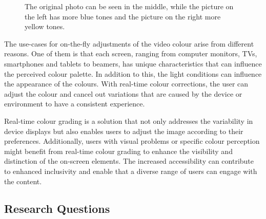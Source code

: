 \documentclass[../MasterThesis.tex]{subfiles}
\begin{document}
	
	\begin{figure}[H]
		\begin{center}
			\caption[Photo in three different colour tones (original, yellow, blue).]{The original photo can be seen in the middle, while the picture on the left has more blue tones and the picture on the right more yellow tones.}
			\label{figure:coloursblueandyellow}
		\end{center}
	\end{figure}
	The use-cases for on-the-fly adjustments of the video colour arise from different reasons. 
	One of them is that each screen, ranging from computer monitors, TVs, smartphones and tablets to beamers, has unique characteristics that can influence the perceived colour palette. 
	In addition to this, the light conditions can influence the appearance of the colours.
	With real-time colour corrections, the user can adjust the colour and cancel out variations that are caused by the device or environment to have a consistent experience.
	
	Real-time colour grading is a solution that not only addresses the variability in device displays but also enables users to adjust the image according to their preferences.
	Additionally, users with visual problems or specific colour perception might benefit from real-time colour grading to enhance the visibility and distinction of the on-screen elements. 
	The increased accessibility can contribute to enhanced inclusivity and enable that a diverse range of users can engage with the content.
	
	
	

	
	
	
	
	
	
	
	
	
	
	
	\subsection{Research Questions} \label{subsection:researchquestions}
	
\end{document}
